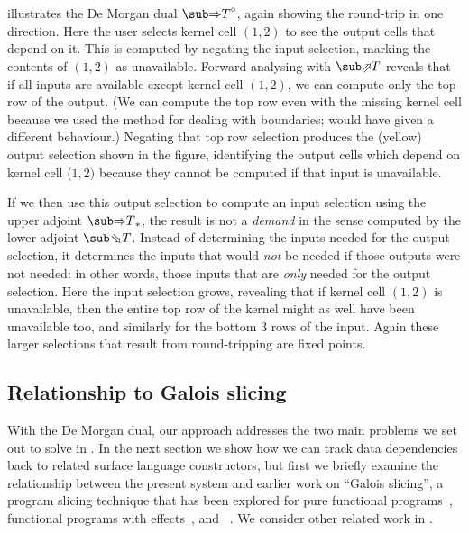  illustrates the De Morgan dual $\dual{\evalGC{T}}$, again showing the round-trip in one direction. Here the user selects kernel cell $(1, 2)$ to see the output cells that depend on it. This is computed by negating the input selection, marking the contents of $(1, 2)$ as unavailable. Forward-analysing with $\evalFwdF{T}$ reveals that if all inputs are available except kernel cell $(1, 2)$, we can compute only the top row of the output. (We can compute the top row even with the missing kernel cell because we used the method  for dealing with boundaries;  would have given a different behaviour.) Negating that top row selection produces the (yellow) output selection shown in the figure, identifying the output cells which depend on kernel cell ($1, 2)$ because they cannot be computed if that input is unavailable.

If we then use this output selection to compute an input selection using the upper adjoint $\upperAdj{\evalGC{T}}$, the result is not a \emph{demand} in the sense computed by the lower adjoint $\evalBwdF{T}$. Instead of determining the inputs needed for the output selection, it determines the inputs that would \emph{not} be needed if those outputs were not needed: in other words, those inputs that are \emph{only} needed for the output selection. Here the input selection grows, revealing that if kernel cell $(1, 2)$ is unavailable, then the entire top row of the kernel might as well have been unavailable too, and similarly for the bottom 3 rows of the input. Again these larger selections that result from round-tripping are fixed points.



\subsection{Relationship to Galois slicing}
\label{sec:toolkit:galois-slicing}

With the De Morgan dual, our approach addresses the two main problems we set out to solve in . In the next section we show how we can track data dependencies back to related surface language constructors, but first we briefly examine the relationship between the present system and earlier work on ``Galois slicing'', a program slicing technique that has been explored for pure functional programs~\cite{perera12a}, functional programs with effects~\cite{ricciotti17}, and \piCalculus~\cite{perera16d}. We consider other related work in .

